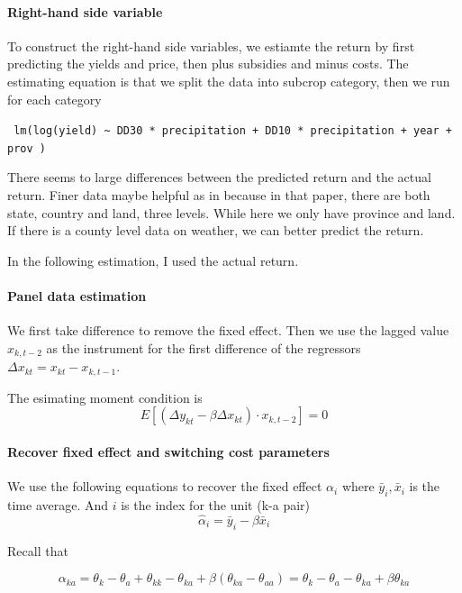 \documentclass[12pt]{article}[margin=1in]
\begin{document}
\paragraph{Right-hand side variable}
To construct the right-hand side variables, we estiamte the return by first predicting the yields and price, then plus subsidies and minus costs. 
The estimating equation is that we split the data into subcrop category, then we run for each category

\verb| lm(log(yield) ~ DD30 * precipitation + DD10 * precipitation + year + prov )|

There seems to large differences between the predicted return and the actual return. Finer data maybe helpful as in \citet{scott2014dynamic} because in that paper, there are both state, country and land, three levels. While here we only have province and land. If there is a county level data on weather, we can better predict the return. 

In the following estimation, I used the actual return.

\paragraph{Panel data estimation}

We first take difference to remove the fixed effect. Then we use the lagged value $x_{k,t-2}$ as the instrument for the first difference of the regressors $\Delta x_{kt} = x_{kt} - x_{k,t-1}$.

The esimating moment condition is 
$$
    E[(\Delta y_{kt} - \beta \Delta x_{kt}) \cdot x_{k,t-2}] = 0
$$


\paragraph{Recover fixed effect and switching cost parameters}

We use the following equations to recover the fixed effect $\alpha_i$ where $\bar{y}_i,\bar{x}_i$ is the time average. And $i$ is the index for the unit (k-a pair)
$$
    \hat{\alpha}_i = \bar{y}_i - \beta \bar{x}_i
$$

Recall that

$$
    \alpha_{ka} = \theta_k-\theta_a + \theta_{kk} - \theta_{ka} + \beta(\theta_{ka}-\theta_{aa}) = \theta_k-\theta_a- \theta_{ka} + \beta \theta_{ka}$$
\end{document}
